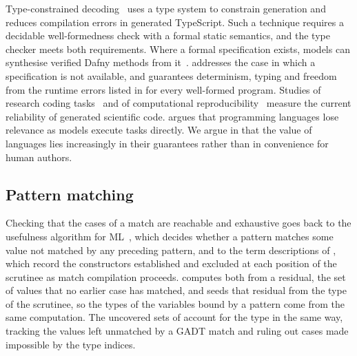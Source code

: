 Type-constrained decoding~\citep{mundler2025} uses a type system to constrain generation and reduces
compilation errors in generated TypeScript. Such a technique requires a decidable well-formedness check with
a formal static semantics, and the \PurePy type checker meets both requirements. Where a formal specification
exists, models can synthesise verified Dafny methods from it~\citep{misu2024}. \PurePy addresses the case in
which a specification is not available, and guarantees determinism, typing and freedom from the runtime
errors listed in  for every well-formed program. Studies of research coding
tasks~\citep{tian2024,chen2025} and of computational reproducibility~\citep{siegel2024} measure the current
reliability of generated scientific code. \citet{welsh2023} argues that programming languages lose relevance
as models execute tasks directly. We argue in  that the value of languages lies
increasingly in their guarantees rather than in convenience for human authors.

\subsection{Pattern matching}

Checking that the cases of a match are reachable and exhaustive goes back to the usefulness algorithm for
ML~\citep{maranget2007}, which decides whether a pattern matches some value not matched by any preceding
pattern, and to the term descriptions of \citet{sestoft1996}, which record the constructors established and
excluded at each position of the scrutinee as match compilation proceeds. \PurePy computes
both from a residual, the set of values that no earlier case has matched, and seeds that residual from the
type of the scrutinee, so the types of the variables bound by a pattern come from the same computation. The
uncovered sets of \citet{karachalias2015} account for the type in the same way, tracking the values left
unmatched by a GADT match and ruling out cases made impossible by the type indices.
